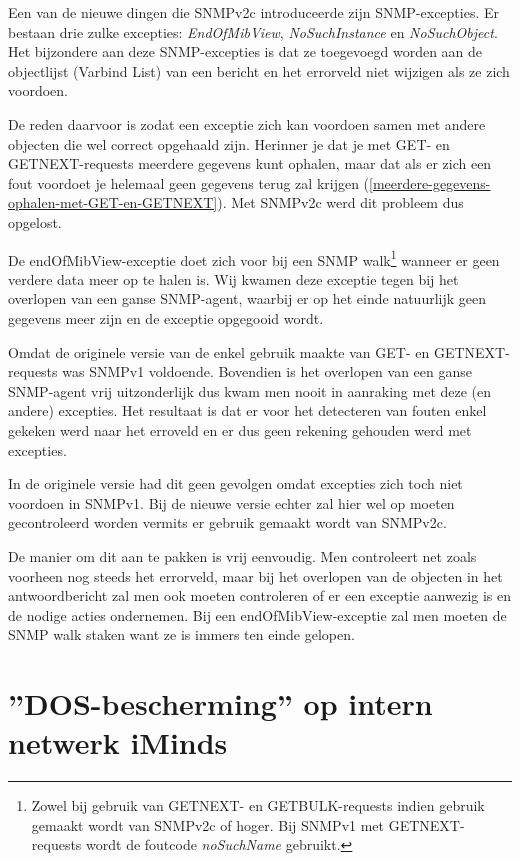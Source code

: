 Een van de nieuwe dingen die SNMPv2c introduceerde zijn SNMP-excepties.
Er bestaan drie zulke excepties: \textit{EndOfMibView}, \textit{NoSuchInstance} en \textit{NoSuchObject}.
Het bijzondere aan deze SNMP-excepties is dat ze toegevoegd worden aan de objectlijst (Varbind List) van een bericht
en het errorveld niet wijzigen als ze zich voordoen\cite{endOfMibView-error-status}.

De reden daarvoor is zodat een exceptie zich kan voordoen samen met andere objecten die wel correct opgehaald zijn.
Herinner je dat je met GET- en GETNEXT-requests meerdere gegevens kunt ophalen,
maar dat als er zich een fout voordoet je helemaal geen gegevens terug zal krijgen (\cref{meerdere-gegevens-ophalen-met-GET-en-GETNEXT}).
Met SNMPv2c werd dit probleem dus opgelost.

De endOfMibView-exceptie doet zich voor bij een SNMP walk\footnote{
	Zowel bij gebruik van GETNEXT- en GETBULK-requests indien gebruik gemaakt wordt van SNMPv2c of hoger.
	Bij SNMPv1 met GETNEXT-requests wordt de foutcode \textit{noSuchName} gebruikt\cite{snmp-exceptions-v2c-to-v1}.
} wanneer er geen verdere data meer op te halen is\cite{snmp-exceptions-explained}.
Wij kwamen deze exceptie tegen bij het overlopen van een ganse SNMP-agent, waarbij er op het einde natuurlijk geen gegevens meer zijn en de exceptie opgegooid wordt.

Omdat de originele versie van de \nwmretriever{} enkel gebruik maakte van GET- en GETNEXT-requests was SNMPv1 voldoende.
Bovendien is het overlopen van een ganse SNMP-agent vrij uitzonderlijk dus kwam men nooit in aanraking met deze (en andere) excepties.
Het resultaat is dat er voor het detecteren van fouten enkel gekeken werd naar het erroveld en er dus geen rekening gehouden werd met excepties.

In de originele versie had dit geen gevolgen omdat excepties zich toch niet voordoen in SNMPv1.
Bij de nieuwe versie echter zal hier wel op moeten gecontroleerd worden vermits er gebruik gemaakt wordt van SNMPv2c.

De manier om dit aan te pakken is vrij eenvoudig.
Men controleert net zoals voorheen nog steeds het errorveld, maar bij het overlopen van de objecten in het antwoordbericht
zal men ook moeten controleren of er een exceptie aanwezig is en de nodige acties ondernemen.
Bij een endOfMibView-exceptie zal men moeten de SNMP walk staken want ze is immers ten einde gelopen.


\section{''DOS-bescherming'' op intern netwerk iMinds}
\label{probleem-dos-bescherming}

